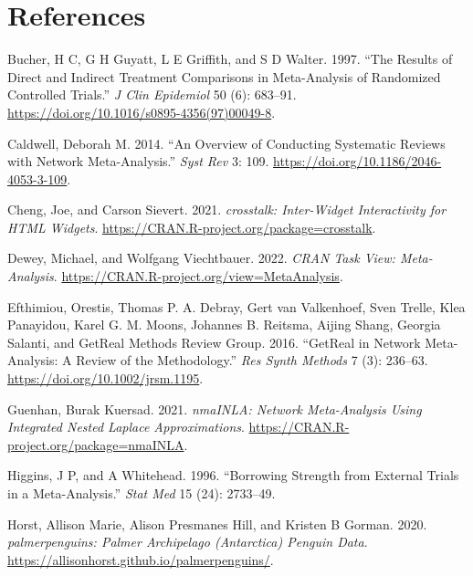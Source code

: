 \hypertarget{references}{%
\section*{References}\label{references}}

\hypertarget{refs}{}
\begin{CSLReferences}{1}{0}
\leavevmode{}%
Bucher, H C, G H Guyatt, L E Griffith, and S D Walter. 1997. {``The Results of Direct and Indirect Treatment Comparisons in Meta-Analysis of Randomized Controlled Trials.''} \emph{J Clin Epidemiol} 50 (6): 683--91. \url{https://doi.org/10.1016/s0895-4356(97)00049-8}.

\leavevmode{}%
Caldwell, Deborah M. 2014. {``An Overview of Conducting Systematic Reviews with Network Meta-Analysis.''} \emph{Syst Rev} 3: 109. \url{https://doi.org/10.1186/2046-4053-3-109}.

\leavevmode{}%
Cheng, Joe, and Carson Sievert. 2021. \emph{{crosstalk}: Inter-Widget Interactivity for HTML Widgets}. \url{https://CRAN.R-project.org/package=crosstalk}.

\leavevmode{}%
Dewey, Michael, and Wolfgang Viechtbauer. 2022. \emph{{CRAN Task View}: Meta-Analysis}. \url{https://CRAN.R-project.org/view=MetaAnalysis}.

\leavevmode{}%
Efthimiou, Orestis, Thomas P. A. Debray, Gert van Valkenhoef, Sven Trelle, Klea Panayidou, Karel G. M. Moons, Johannes B. Reitsma, Aijing Shang, Georgia Salanti, and GetReal Methods Review Group. 2016. {``GetReal in Network Meta-Analysis: A Review of the Methodology.''} \emph{Res Synth Methods} 7 (3): 236--63. \url{https://doi.org/10.1002/jrsm.1195}.

\leavevmode{}%
Guenhan, Burak Kuersad. 2021. \emph{nmaINLA: Network Meta-Analysis Using Integrated Nested Laplace Approximations}. \url{https://CRAN.R-project.org/package=nmaINLA}.

\leavevmode{}%
Higgins, J P, and A Whitehead. 1996. {``Borrowing Strength from External Trials in a Meta-Analysis.''} \emph{Stat Med} 15 (24): 2733--49.

\leavevmode{}%
Horst, Allison Marie, Alison Presmanes Hill, and Kristen B Gorman. 2020. \emph{{palmerpenguins}: Palmer Archipelago (Antarctica) Penguin Data}. \url{https://allisonhorst.github.io/palmerpenguins/}.


\end{CSLReferences}
